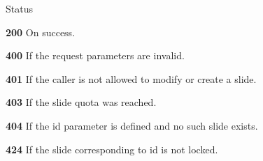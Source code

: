 \begin{DoxyParagraph}{Status}

\begin{DoxyItemize}
\item {\bfseries 200} On success.
\item {\bfseries 400} If the request parameters are invalid.
\item {\bfseries 401} If the caller is not allowed to modify or create a slide.
\item {\bfseries 403} If the slide quota was reached.
\item {\bfseries 404} If the id parameter is defined and no such slide exists.
\item {\bfseries 424} If the slide corresponding to id is not locked. 
\end{DoxyItemize}
\end{DoxyParagraph}
